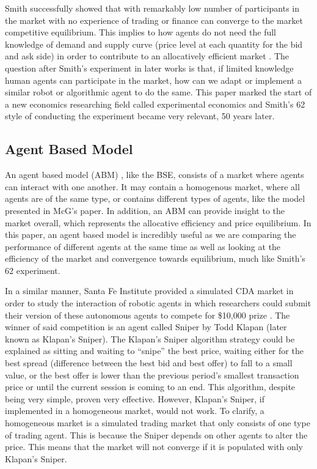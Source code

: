 Smith successfully showed that with remarkably low number of participants in the market with no experience of trading or finance can converge to the market competitive equilibrium. This implies to how agents do not need the full knowledge of demand and supply curve (price level at each quantity for the bid and ask side) in order to contribute to an allocatively efficient market \cite{smith1962}. The question after Smith’s experiment in later works is that, if limited knowledge human agents can participate in the market, how can we adapt or implement a similar robot or algorithmic agent to do the same. This paper marked the start of a new economics researching field called experimental economics and Smith’s 62 style of conducting the experiment became very relevant, 50 years later.

\subsection{Agent Based Model}
An agent based model (ABM) , like the BSE, consists of a market where agents can interact with one another. It may contain a homogenous market, where all agents are of the same type, or contains different types of agents, like the model presented in McG's paper. In addition, an ABM can provide insight to the market overall, which represents the allocative efficiency and price equilibrium. In this paper, an agent based model is incredibly useful as we are comparing the performance of different agents at the same time as well as looking at the efficiency of the market and convergence towards equilibrium, much like Smith’s 62 experiment.

In a similar manner, Santa Fe Institute provided a simulated CDA market in order to study the interaction of robotic agents in which researchers could submit their version of these autonomous agents to compete for \$10,000 prize \cite{Santafe}. The winner of said competition is an agent called Sniper by Todd Klapan (later known as Klapan’s Sniper). The Klapan’s Sniper algorithm strategy could be explained as sitting and waiting to “snipe” the best price, waiting either for the best spread (difference between the best bid and best offer) to fall to a small value, or the best offer is lower than the previous period’s smallest transaction price or until the current session is coming to an end. This algorithm, despite being very simple, proven very effective. However, Klapan’s Sniper, if implemented in a  homogeneous market, would not work. To clarify, a homogeneous market is a simulated trading market that only consists of one type of trading agent. This is because the Sniper depends on other agents to alter the price. This means that the market will not converge if it is populated with only Klapan’s Sniper. 

